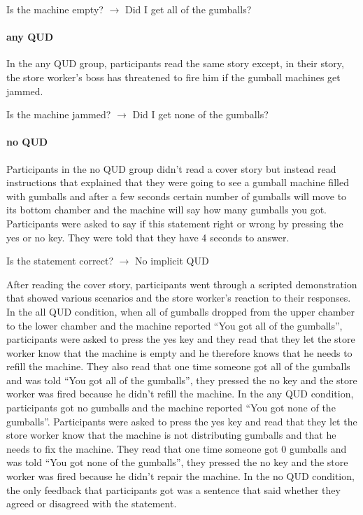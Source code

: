 \documentclass[12pt]{article}
\begin{document}
\begin{center}Is the machine empty? $\rightarrow$ Did I get all of the gumballs?\end{center}

\paragraph{any QUD} In the any QUD group, participants read the same story except, in their story, the store worker’s boss has threatened to fire him if the gumball machines get jammed. 

\begin{center}Is the machine jammed? $\rightarrow$ Did I get none of the gumballs?\end{center}

\paragraph{no QUD} Participants in the no QUD group didn’t read a cover story but instead read instructions that explained that they were going to see a gumball machine filled with gumballs and after a few seconds certain number of gumballs will move to its bottom chamber and the machine will say how many gumballs you got. Participants were asked to say if this statement right or wrong by pressing the yes or no key. They were told that they have 4 seconds to answer.

\begin{center}Is the statement correct? $\rightarrow$ No implicit QUD\end{center}

After reading the cover story, participants went through a scripted demonstration that showed various scenarios and the store worker’s reaction to their responses. In the all QUD condition, when all of gumballs dropped from the upper chamber to the lower chamber and the machine reported “You got all of the gumballs”, participants were asked to press the yes key and they read that they let the store worker know that the machine is empty and he therefore knows that he needs to refill the machine. They also read that one time someone got all of the gumballs and was told “You got all of the gumballs”, they pressed the no key and the store worker was fired because he didn’t refill the machine. In the any QUD condition, participants got no gumballs and the machine reported “You got none of the gumballs”. Participants were asked to press the yes key and read that they let the store worker know that the machine is not distributing gumballs and that he needs to fix the machine. They read that one time someone got 0 gumballs and was told “You got none of the gumballs”, they pressed the no key and the store worker was fired because he didn’t repair the machine. In the no QUD condition, the only feedback that participants got was a sentence that said whether they agreed or disagreed with the statement.
\end{document}
